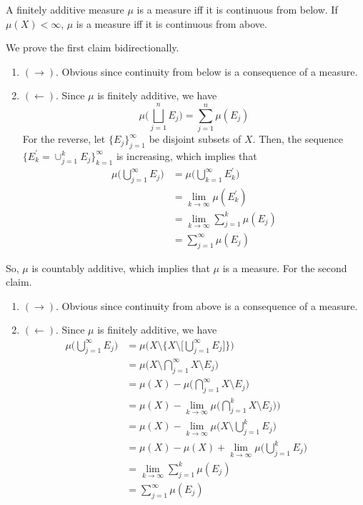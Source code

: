 	\begin{exercise}[Folland 1.11]
		A finitely additive measure $\mu$ is a measure iff it is continuous from below. If $\mu(X) < \infty$, $\mu$ is a measure iff it is continuous from above.
	\end{exercise}
	\begin{solution}
		We prove the first claim bidirectionally. 
		\begin{enumerate}
		  \item $(\rightarrow)$. Obvious since continuity from below is a consequence of a measure. 
			\item $(\leftarrow)$. Since $\mu$ is finitely additive, we have 
				\begin{equation}
					\mu\bigg( \bigsqcup_{j=1}^n E_j \bigg) = \sum_{j=1}^n \mu(E_j)
				\end{equation}
				For the reverse, let $\{E_j\}_{j=1}^\infty$ be disjoint subsets of $X$. Then, the sequence $\{E_k^\prime = \cup_{j=1}^k E_j \}_{k=1}^\infty$ is increasing, which implies that 
				\begin{align}
					\mu \bigg( \bigcup_{j=1}^\infty E_j \bigg) 
						& = \mu \bigg( \bigcup_{k=1}^\infty E_k^\prime \bigg) \\ 
						& = \lim_{k \to \infty} \mu(E_k^\prime) \\ 
						& = \lim_{k \to \infty} \sum_{j=1}^k \mu(E_j) \\ 
						& = \sum_{j=1}^\infty \mu(E_j)
				\end{align}
		\end{enumerate}
		So, $\mu$ is countably additive, which implies that $\mu$ is a measure. For the second claim. 
		\begin{enumerate}
		  \item $(\rightarrow)$. Obvious since continuity from above is a consequence of a measure. 
			\item $(\leftarrow)$. Since $\mu$ is finitely additive, we have 
				\begin{align}
					\mu \bigg( \bigcup_{j=1}^\infty E_j \bigg) 
						& = \mu \bigg( X \setminus \bigg\{ X \setminus \bigg[ \bigcup_{j=1}^\infty E_j \bigg] \bigg\} \bigg) \\ 
						& = \mu \bigg( X \setminus \bigcap_{j=1}^\infty X \setminus E_j \bigg) \\ 
						& = \mu(X) - \mu \bigg( \bigcap_{j=1}^\infty X \setminus E_j \bigg) && \tag{Finite Additivity} \\ 
						& = \mu(X) - \lim_{k \to \infty} \mu \bigg( \bigcap_{j=1}^k X \setminus E_j ) \bigg) \\ 
						& = \mu(X) - \lim_{k \to \infty} \mu \bigg( X \setminus \bigcup_{j=1}^k E_j \bigg) \\ 
						& = \mu(X) - \mu(X) + \lim_{k \to \infty} \mu \bigg( \bigcup_{j=1}^k E_j \bigg) \\ 
						& = \lim_{k \to \infty} \sum_{j=1}^k \mu(E_j) \\ 
						& = \sum_{j=1}^\infty \mu(E_j)
				\end{align}
		\end{enumerate}
	\end{solution}

